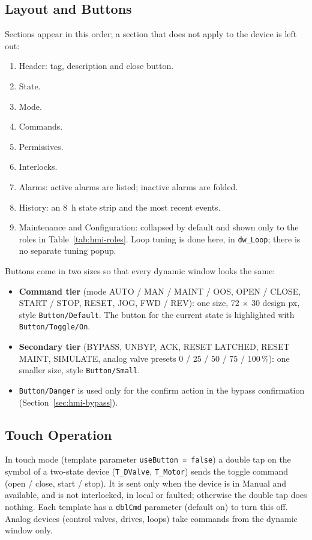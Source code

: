 \subsection[Layout and Buttons]{Layout and Buttons \newmark}\label{sec:hmi-dw-layout}
Sections appear in this order; a section that does not apply to the device is left out:
\begin{enumerate}[itemsep=1pt]
  \item Header: tag, description and close button.
  \item State.
  \item Mode.
  \item Commands.
  \item Permissives.
  \item Interlocks.
  \item Alarms: active alarms are listed; inactive alarms are folded.
  \item History: an 8~h state strip and the most recent events.
  \item Maintenance and Configuration: collapsed by default and shown only to the roles in Table~\ref{tab:hmi-roles}. Loop tuning is done here, in \texttt{dw\_Loop}; there is no separate tuning popup.
\end{enumerate}
Buttons come in two sizes so that every dynamic window looks the same:
\begin{itemize}[itemsep=1pt]
  \item \textbf{Command tier} (mode AUTO /\allowbreak{} MAN /\allowbreak{} MAINT /\allowbreak{} OOS, OPEN /\allowbreak{} CLOSE, START /\allowbreak{} STOP, RESET, JOG, FWD /\allowbreak{} REV): one size, 72 $\times$ 30 design px, style \texttt{Button/Default}. The button for the current state is highlighted with \texttt{Button/Toggle/On}.
  \item \textbf{Secondary tier} (BYPASS, UNBYP, ACK, RESET LATCHED, RESET MAINT, SIMULATE, analog valve presets 0 /\allowbreak{} 25 /\allowbreak{} 50 /\allowbreak{} 75 /\allowbreak{} 100\,\%): one smaller size, style \texttt{Button/Small}.
  \item \texttt{Button/Danger} is used only for the confirm action in the bypass confirmation (Section~\ref{sec:hmi-bypass}).
\end{itemize}

\subsection[Touch Operation]{Touch Operation \newmark}\label{sec:hmi-touch}
In touch mode (template parameter \texttt{useButton = false}) a double tap on the symbol of a two-state device (\texttt{T\_DValve}, \texttt{T\_Motor}) sends the toggle command (open /\allowbreak{} close, start /\allowbreak{} stop). It is sent only when the device is in Manual and available, and is not interlocked, in local or faulted; otherwise the double tap does nothing. Each template has a \texttt{dblCmd} parameter (default on) to turn this off. Analog devices (control valves, drives, loops) take commands from the dynamic window only.

